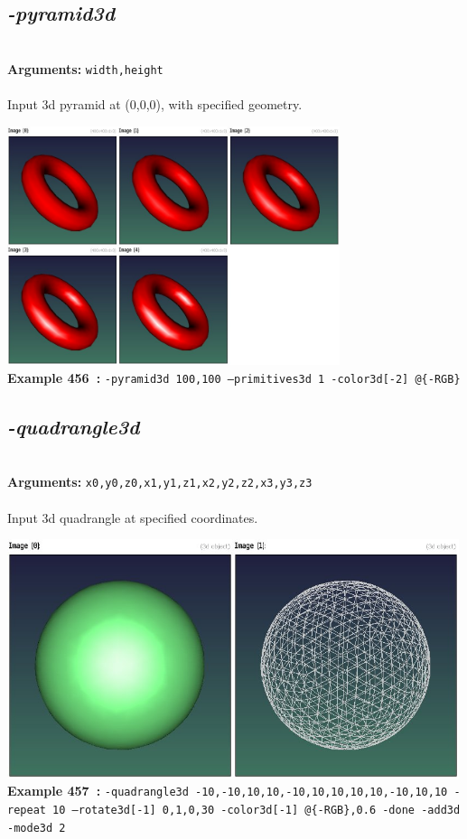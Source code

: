 \documentclass[a4paper,11pt,twoside]{book}
\begin{document}
\subsection{\emph{-pyramid3d} }\vspace*{-0.5em}
~\\\textbf{Arguments: } 
{\small \texttt{width,height}}\\~\\
Input 3d pyramid at (0,0,0), with specified geometry.
\begin{center}\includegraphics[keepaspectratio=true,height=7cm,width=\textwidth]{img/gmic_def456.jpg}\\
{\footnotesize \textbf{Example 456~:} \texttt{-pyramid3d 100,100 --primitives3d 1 -color3d[-2] @\{-RGB\}}}
\end{center}

\subsection{\emph{-quadrangle3d} }\vspace*{-0.5em}
~\\\textbf{Arguments: } 
{\small \texttt{x0,y0,z0,x1,y1,z1,x2,y2,z2,x3,y3,z3}}\\~\\
Input 3d quadrangle at specified coordinates.
\begin{center}\includegraphics[keepaspectratio=true,height=7cm,width=\textwidth]{img/gmic_def457.jpg}\\
{\footnotesize \textbf{Example 457~:} \texttt{-quadrangle3d -10,-10,10,10,-10,10,10,10,10,-10,10,10 -repeat 10 --rotate3d[-1] 0,1,0,30 -color3d[-1] @\{-RGB\},0.6 -done -add3d -mode3d 2}}
\end{center}
\end{document}
